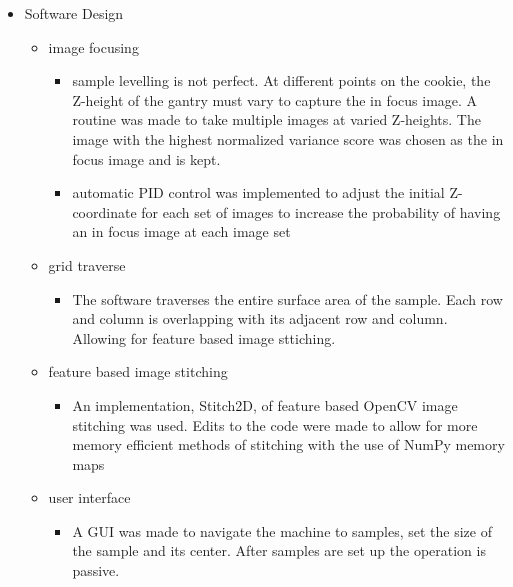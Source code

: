 \documentclass{article}
\begin{document}
\begin{outline}[itemize]
\begin{itemize}
		\item Software Design
			\begin{itemize}
			\item image focusing
				\begin{itemize}
				\item sample levelling is not perfect. At different points on the cookie, the Z-height of the gantry must vary to capture the in focus image. A routine was made to take multiple images at varied Z-heights. The image with the highest normalized variance score was chosen as the in focus image and is kept.
				\item automatic PID control was implemented to adjust the initial Z-coordinate for each set of images to increase the probability of having an in focus image at each image set
				\end{itemize}
			\item grid traverse
				\begin{itemize}
				\item The software traverses the entire surface area of the sample. Each row and column is overlapping with its adjacent row and column. Allowing for feature based image sttiching.
				\end{itemize}
			\item feature based image stitching
				\begin{itemize}
				\item An implementation, Stitch2D, of feature based OpenCV image stitching was used. Edits to the code were made to allow for more memory efficient methods of stitching with the use of NumPy memory maps
				\end{itemize}
			\item user interface
				\begin{itemize}
				\item A GUI was made to navigate the machine to samples, set the size of the sample and its center. After samples are set up the operation is passive.
				\end{itemize}
			\end{itemize}
		\end{itemize}


\end{outline}
\end{document}
